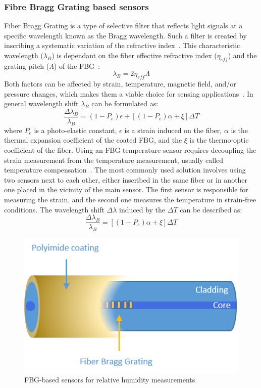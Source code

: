 \subsubsection{Fibre Bragg Grating based sensors}
\label{fbg}
Fiber Bragg Grating is a type of selective filter that reflects light signals at a specific wavelength known as the Bragg wavelength. Such a filter is created by inscribing a systematic variation of the refractive index~\cite{fbg_overview}. This characteristic wavelength ($\lambda_{B}$) is dependant on the fiber effective refractive index ($\eta_{eff}$) and the grating pitch ($\Lambda$) of the \gls{FBG}~\cite{Othonos2000FiberBG}:
\begin{equation}
    \lambda_{B} = 2 \eta_{eff} \Lambda
\end{equation}
Both factors can be affected by strain, temperature, magnetic field, and/or pressure changes, which makes them a viable choice for sensing applications~\cite{Yun-Jiang_Rao_1997}. In general wavelength shift $\lambda_{B}$ can be formulated as:
\begin{equation}
    \frac{\Delta\lambda_{B}}{\lambda_{B}}=(1-P_{e}) \epsilon + \left [(1-P_{e}) \alpha + \xi  \right ] \Delta T
\end{equation}
where $P_{e}$ is a photo-elastic constant, $\epsilon$ is a strain induced on the fiber, $\alpha$ is the thermal expansion coefficient of the coated \gls{FBG}, and the $\xi$ is the thermo-optic coefficient of the fiber. Using an \gls{FBG} temperature sensor requires decoupling the strain measurement from the temperature measurement, usually called temperature compensation~\cite{Yun-Jiang_Rao_1997}. The most commonly used solution involves using two sensors next to each other, either inscribed in the same fiber or in another one placed in the vicinity of the main sensor. The first sensor is responsible for measuring the strain, and the second one measures the temperature in strain-free conditions. The wavelength shift $\Delta \lambda$ induced by the $\Delta T$ can be described as:
\begin{equation}
    \frac{\Delta\lambda_{B}}{\lambda_{B}}=\left [(1-P_{e}) \alpha + \xi  \right ] \Delta T
\end{equation}


\begin{figure}[!h]
\centering
\includegraphics[width=0.45\columnwidth]{Chapter5/images/Picture1.png}
\caption{FBG-based sensors for relative humidity measurements}
\label{fig:fbg_scheme}
\end{figure}


